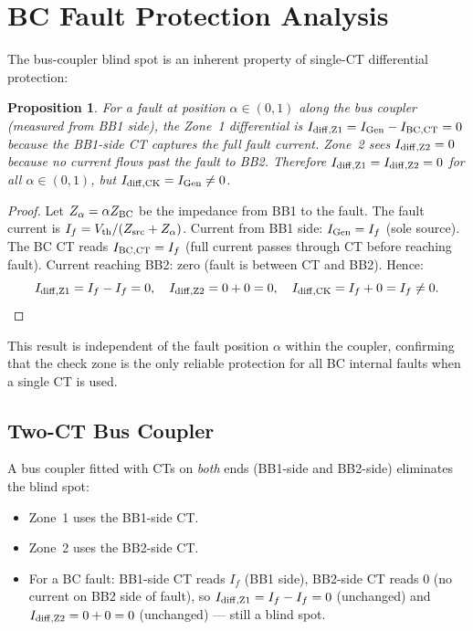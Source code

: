 \documentclass[12pt,a4paper]{article}
\newtheorem{proposition}{Proposition}[section]
\begin{document}
\section{BC Fault Protection Analysis}

The bus-coupler blind spot is an inherent property of single-CT
differential protection:

\begin{proposition}
  \label{prop:blind_spot}
  For a fault at position $\alpha \in (0,1)$ along the bus coupler
  (measured from BB1 side), the Zone~1 differential is
  $I_{\rm diff,Z1} = I_{\rm Gen} - I_{\rm BC,CT} = 0$ because the
  BB1-side CT captures the full fault current.
  Zone~2 sees $I_{\rm diff,Z2} = 0$ because no current flows past the
  fault to BB2.
  Therefore $I_{\rm diff,Z1} = I_{\rm diff,Z2} = 0$ for
  all $\alpha \in (0,1)$, but $I_{\rm diff,CK} = I_{\rm Gen} \neq 0$.
\end{proposition}

\begin{proof}
  Let $Z_\alpha = \alpha Z_{\rm BC}$ be the impedance from BB1 to the
  fault.  The fault current is $I_f = V_{\rm th} / (Z_{\rm src} +
  Z_\alpha)$.  Current from BB1 side: $I_{\rm Gen} = I_f$ (sole
  source).  The BC CT reads $I_{\rm BC,CT} = I_f$ (full current passes
  through CT before reaching fault).  Current reaching BB2: zero
  (fault is between CT and BB2).  Hence:
  \[
    I_{\rm diff,Z1} = I_f - I_f = 0, \quad
    I_{\rm diff,Z2} = 0 + 0 = 0, \quad
    I_{\rm diff,CK} = I_f + 0 = I_f \neq 0. \qedhere
  \]
\end{proof}

This result is independent of the fault position $\alpha$ within the
coupler, confirming that the check zone is the only reliable protection
for all BC internal faults when a single CT is used.

\subsection{Two-CT Bus Coupler}

A bus coupler fitted with CTs on \emph{both} ends (BB1-side and BB2-side)
eliminates the blind spot:
\begin{itemize}
  \item Zone~1 uses the BB1-side CT.
  \item Zone~2 uses the BB2-side CT.
  \item For a BC fault: BB1-side CT reads $I_f$ (BB1 side), BB2-side
    CT reads 0 (no current on BB2 side of fault), so
    $I_{\rm diff,Z1} = I_f - I_f = 0$ (unchanged) and
    $I_{\rm diff,Z2} = 0 + 0 = 0$ (unchanged) — still a blind spot.
\end{itemize}
\end{document}
